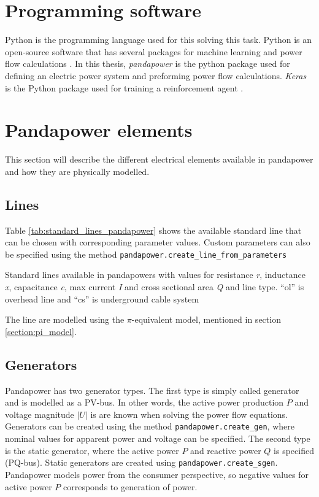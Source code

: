 \documentclass[class=book, crop=false]{standalone}
\begin{document}
\section{Programming software}
Python is the programming language used for this solving this task. Python is an open-source software that has several packages for machine learning and power flow calculations \cite{python_web}. In this thesis, \textit{pandapower} is the python package used for defining an electric power system and preforming power flow calculations\cite{pandapower}. \textit{Keras} is the Python package used for training a reinforcement agent \cite{keras_chollet2015}.

\section{Pandapower elements}
This section will describe the different electrical elements available in pandapower and how they are physically modelled.
\subsection{Lines}
Table \ref{tab:standard_lines_pandapower} shows the available standard line that can be chosen with corresponding parameter values. Custom parameters can also be specified using the method \texttt{pandapower.create\_line\_from\_parameters}
\begin{table}[]
    \centering
    \caption{Standard lines available in pandapowers with values for resistance \textit{r}, inductance \textit{x}, capacitance \textit{c}, max current \textit{I} and cross sectional area \textit{Q} and line type. “ol” is overhead line and “cs” is underground cable system}
    \label{tab:standard_lines_pandapower}
\end{table}
The line are modelled using the $\pi$-equivalent model, mentioned in section \ref{section:pi_model}.

\subsection{Generators}
Pandapower has two generator types. The first type is simply called generator and is modelled as a PV-bus. In other words, the active power production $P$ and voltage magnitude $|U|$ is are known when solving the power flow equations. Generators can be created using the method \texttt{pandapower.create\_gen}, where nominal values for apparent power and voltage can be specified. The second type is the static generator, where the active power $P$ and reactive power $Q$ is specified (PQ-bus). Static generators are created using \texttt{pandapower.create\_sgen}. Pandapower models power from the consumer perspective, so negative values for active power $P$ corresponds to generation of power.
\end{document}
